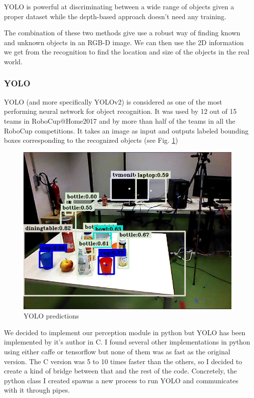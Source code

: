 \documentclass[a4paper, twocolumn]{article}
\begin{document}
  YOLO is powerful at discriminating between a wide range of objects given a proper dataset while the depth-based approach doesn't need any training.

  The combination of these two methods give use a robust way of finding  known and unknown objects in an RGB-D image. We can then use the 2D information we get from the recognition to find the location and size of the objects in the real world.

    \subsubsection{YOLO}

    YOLO (and more specifically YOLOv2) is considered as one of the most performing neural network for object recognition. It was used by 12 out of 15 teams in RoboCup@Home2017 and by more than half of the teams in all the RoboCup competitions. It takes an image as input and outputs labeled bounding boxes corresponding to the recognized objects (see Fig. \ref{YOLO_rgb})

    \begin{figure}[!b]
        \includegraphics[width=\columnwidth]{../img/yolo_table.jpg}
        \caption{YOLO predictions}
        \label{YOLO_rgb}
    \end{figure}

    We decided to implement our perception module in python but YOLO has been implemented by it's author in C. I found several other implementations in python using either caffe or tensorflow but none of them was as fast as the original version. The C version was 5 to 10 times faster than the others, so I decided to create a kind of bridge between that and the rest of the code. Concretely, the python class I created spawns a new process to run YOLO and communicates with it through pipes.
\end{document}
